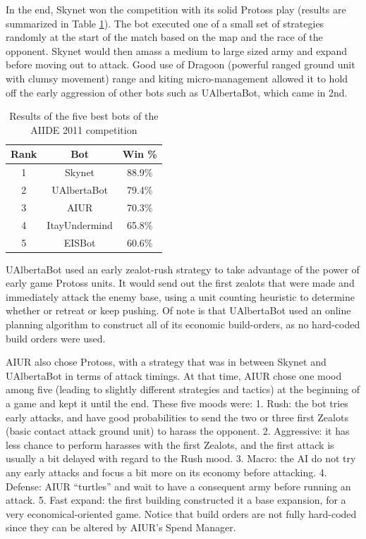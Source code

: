 \documentclass{llncs}
\begin{document}
In the  end, Skynet  won the competition  with its solid  Protoss play
(results  are  summarized   in  Table  \ref{tab:aiide2011}).  The  bot
executed one of a small set of strategies randomly at the start of the
match based on the map and the race of the opponent. Skynet would then
amass a  medium to large  sized army and  expand before moving  out to
attack. Good  use of Dragoon (powerful ranged ground unit with clumsy movement) range and  kiting micro-management allowed
it to hold off the early aggression of other bots such as UAlbertaBot,
which came in 2nd.

\begin{table}[!b]
\caption{Results of the five best bots of the AIIDE 2011 competition}
\label{tab:aiide2011}
\centering
\begin{tabular}{|c|c|c|}
\hline
{\bfseries Rank} & {\bfseries Bot} & {\bfseries Win \%} \\
\hline
1 & Skynet & 88.9\% \\
2 & UAlbertaBot & 79.4\% \\
3 & AIUR & 70.3\% \\
4 & ItayUndermind & 65.8\% \\
5 & EISBot & 60.6\% \\
\hline
\end{tabular}
\end{table}

UAlbertaBot used an early zealot-rush strategy to take advantage of the power of early game Protoss units. 
It would send out the first zealots that were made and immediately attack the enemy base, using a unit
counting heuristic to determine whether or retreat or keep pushing. Of note is that UAlbertaBot used an
online planning algorithm to construct all of its economic build-orders\cite{churchill2011build}, as no hard-coded build orders
were used. 

AIUR also chose  Protoss, with a strategy that was in between Skynet
and UAlbertaBot in terms of  attack timings.  At that time, AIUR chose
one  mood among  five (leading  to slightly  different  strategies and
tactics) at the  beginning of a game and kept it  until the end. These
five moods were: 1. Rush: the bot tries early attacks, and have good
  probabilities to send the two or three first Zealots (basic contact attack ground unit) to harass the
  opponent. 2. Aggressive: it has less chance to perform harasses with
  the first Zealots, and the first attack is usually a bit delayed
  with regard to the Rush mood. 3. Macro: the AI do not try any early attacks and focus a bit
  more on its economy before attacking. 4. Defense: AIUR  ``turtles'' and wait to have a consequent
  army before running an attack. 5. Fast expand:  the  first building  constructed it  a base
  expansion, for a very economical-oriented game. Notice that build orders are not fully hard-coded since they can be
altered by AIUR's Spend Manager.
\end{document}

